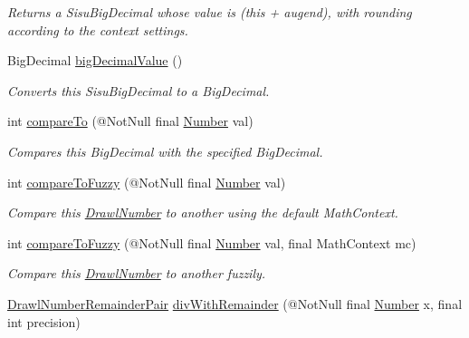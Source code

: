 \begin{DoxyCompactItemize}
\begin{DoxyCompactList}\small\item\em Returns a Sisu\+Big\+Decimal whose value is (this + augend), with rounding according to the context settings. \end{DoxyCompactList}\item 
Big\+Decimal \hyperlink{interfacecom_1_1aarrelaakso_1_1drawl_1_1_number_a88d32e8ed7137662dc845ac6937107e6}{big\+Decimal\+Value} ()
\begin{DoxyCompactList}\small\item\em Converts this Sisu\+Big\+Decimal to a Big\+Decimal. \end{DoxyCompactList}\item 
int \hyperlink{interfacecom_1_1aarrelaakso_1_1drawl_1_1_number_a8182808f41dc9573e32884e7155f2776}{compare\+To} (@Not\+Null final \hyperlink{interfacecom_1_1aarrelaakso_1_1drawl_1_1_number}{Number} val)
\begin{DoxyCompactList}\small\item\em Compares this Big\+Decimal with the specified Big\+Decimal. \end{DoxyCompactList}\item 
int \hyperlink{interfacecom_1_1aarrelaakso_1_1drawl_1_1_number_abe6993852fed7bc6f13dbda74b78dde3}{compare\+To\+Fuzzy} (@Not\+Null final \hyperlink{interfacecom_1_1aarrelaakso_1_1drawl_1_1_number}{Number} val)
\begin{DoxyCompactList}\small\item\em Compare this \hyperlink{classcom_1_1aarrelaakso_1_1drawl_1_1_drawl_number}{Drawl\+Number} to another using the default Math\+Context. \end{DoxyCompactList}\item 
int \hyperlink{interfacecom_1_1aarrelaakso_1_1drawl_1_1_number_afb73cae0a12c1d25e450be6270eecfb1}{compare\+To\+Fuzzy} (@Not\+Null final \hyperlink{interfacecom_1_1aarrelaakso_1_1drawl_1_1_number}{Number} val, final Math\+Context mc)
\begin{DoxyCompactList}\small\item\em Compare this \hyperlink{classcom_1_1aarrelaakso_1_1drawl_1_1_drawl_number}{Drawl\+Number} to another fuzzily. \end{DoxyCompactList}\item 
\hyperlink{classcom_1_1aarrelaakso_1_1drawl_1_1_drawl_number_remainder_pair}{Drawl\+Number\+Remainder\+Pair} \hyperlink{interfacecom_1_1aarrelaakso_1_1drawl_1_1_number_abf7f5f2ea47601b2dbf399c68e4bf895}{div\+With\+Remainder} (@Not\+Null final \hyperlink{interfacecom_1_1aarrelaakso_1_1drawl_1_1_number}{Number} x, final int precision)

\end{DoxyCompactItemize}
